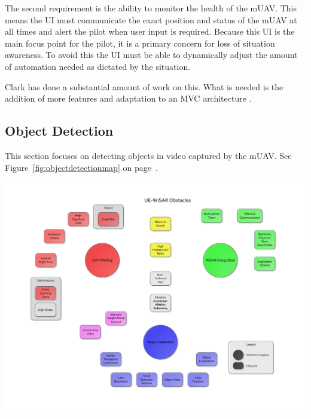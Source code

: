 \documentclass[12pt]{IEEEtran}
\begin{document}
The second requirement is the ability to monitor the health of the mUAV.
This means the UI must communicate the exact position and status of the mUAV at
all times and alert the pilot when user input is required.  Because this UI
is the main focus point for the pilot, it is a primary concern for loss of
situation awareness.  To avoid this the UI must be able to dynamically adjust
the amount of automation needed as dictated by the situation.

Clark has done a substantial amount of work on this.  What is needed is the
addition of more features and adaptation to an MVC architecture
\cite{uavCode}.

\subsection{Object Detection}
This section focuses on detecting objects
in video captured by the mUAV.  See Figure~\ref{fig:objectdetectionmap} on page~\pageref{fig:objectdetectionmap}.

\begin{mapping*}[htp]
	\vspace{-40pt}
	\hspace{-80pt}
	\includegraphics[keepaspectratio=true, width=\paperheight, height=\paperheight,
	 page=4, angle=90]{obstacle_solution_map.pdf}
	 \label{fig:objectdetectionmap}
\end{mapping*}
\end{document}
